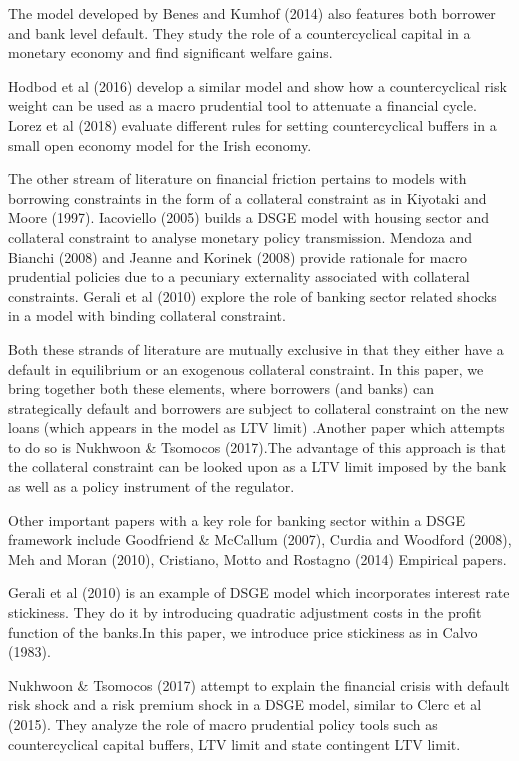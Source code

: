 \documentclass[12pt]{article}
\numberwithin{equation}{section}
\begin{document}
The model developed by Benes and Kumhof (2014) also features both borrower and bank level default. They study the role of a countercyclical capital in a monetary economy and find significant welfare gains.

Hodbod et al (2016) develop a similar model and show how a countercyclical risk weight can be used as a macro prudential tool to attenuate a financial cycle. Lorez et al (2018) evaluate different rules for setting countercyclical buffers in a small open economy model for the Irish economy.

The other stream of literature on financial friction pertains to models with borrowing constraints in the form of a collateral constraint as in Kiyotaki and Moore (1997). Iacoviello (2005) builds a DSGE model with housing sector and collateral constraint to analyse monetary policy transmission. Mendoza and Bianchi (2008) and Jeanne and Korinek (2008) provide rationale for macro prudential policies due to a pecuniary externality associated with collateral constraints.  Gerali et al (2010) explore the role of banking sector related shocks in a model with binding collateral constraint.

Both these strands of literature are mutually exclusive in that they either have a default in equilibrium or an exogenous collateral constraint. In this paper, we bring together both these elements, where borrowers (and banks) can strategically default and borrowers are subject to collateral constraint on the new loans (which appears in the model as LTV limit) .Another paper which attempts to do so is Nukhwoon \& Tsomocos (2017).The advantage of this approach is that the collateral constraint can be looked upon as a LTV limit imposed by the bank as well as a policy instrument of the regulator.

Other important papers with a key role for banking sector within a DSGE framework include Goodfriend \& McCallum (2007), Curdia and Woodford (2008), Meh and Moran (2010),  Cristiano, Motto and Rostagno (2014) 
Empirical papers.

Gerali et al (2010) is an example of DSGE model which incorporates interest rate stickiness. They do it by introducing quadratic adjustment costs in the profit function of the banks.In this paper, we introduce price stickiness as in Calvo (1983).

Nukhwoon \& Tsomocos (2017) attempt to explain the financial crisis with default risk shock and a risk premium shock in a  DSGE model, similar to Clerc et al (2015). They analyze the role of macro prudential policy tools such as countercyclical capital buffers, LTV limit and state contingent LTV limit.
\end{document}
